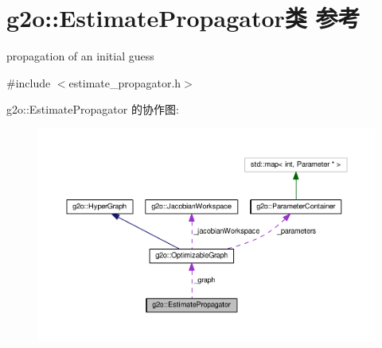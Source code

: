 \hypertarget{classg2o_1_1EstimatePropagator}{\section{g2o\-:\-:Estimate\-Propagator类 参考}
\label{classg2o_1_1EstimatePropagator}
}


propagation of an initial guess  




{\ttfamily \#include $<$estimate\-\_\-propagator.\-h$>$}



g2o\-:\-:Estimate\-Propagator 的协作图\-:
\nopagebreak
\begin{figure}[H]
\begin{center}
\leavevmode
\includegraphics[width=350pt]{classg2o_1_1EstimatePropagator__coll__graph}
\end{center}
\end{figure}
